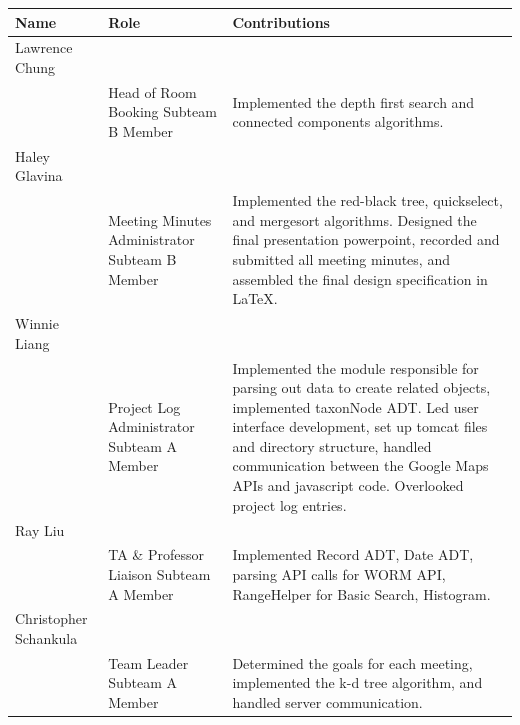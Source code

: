 \documentclass{article}
\begin{document}
\begin{table}[h]
	\centering
	\begin{tabular}{p{0.16\hsize}p{0.38\hsize}p{0.38\hsize}}
		\toprule
		\textbf{Name} & \textbf{Role} & \textbf{Contributions}\\
		\midrule
		Lawrence Chung\\
		& Head of Room Booking \newline Subteam B Member
		& Implemented the depth first search and connected components algorithms. \\
		\midrule
		Haley Glavina\\
		& Meeting Minutes Administrator \newline Subteam B Member
		& Implemented the red-black tree, quickselect, and mergesort algorithms. Designed the final presentation powerpoint, recorded and submitted all meeting minutes, and assembled the final design specification in LaTeX.\\
		\midrule
		Winnie Liang\\
		& Project Log Administrator \newline Subteam A Member
		& Implemented the module responsible for parsing out data to create related objects, implemented taxonNode ADT. Led user interface development, set up tomcat files and directory structure,  handled communication between the Google Maps APIs and javascript code. Overlooked project log entries.\\
		\midrule
		Ray Liu\\
		& TA \& Professor Liaison \newline Subteam A Member
		& Implemented Record ADT, Date ADT, parsing API calls for WORM API, RangeHelper for Basic Search, Histogram.\\
		\midrule
		Christopher Schankula\\
		& Team Leader \newline Subteam A Member
		& Determined the goals for each meeting, implemented the k-d tree algorithm, and handled server communication. \\		
		\bottomrule
	\end{tabular}
\end{table}


\newpage
\end{document}
